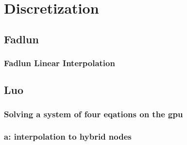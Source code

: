 \documentclass[onehalf,11pt]{beavtex}
\begin{document}
\appendix
\chapter{Discretization}
\section{Fadlun}
\subsection{Fadlun Linear Interpolation}\label{Fadlun Linear Interpolation}
\section{Luo}
\subsection{Solving a system of four eqations on the gpu}\label{system of euqations}
\subsection{a: interpolation to hybrid nodes}
\label{a: interpolation to hybrid nodes}
\end{document}
